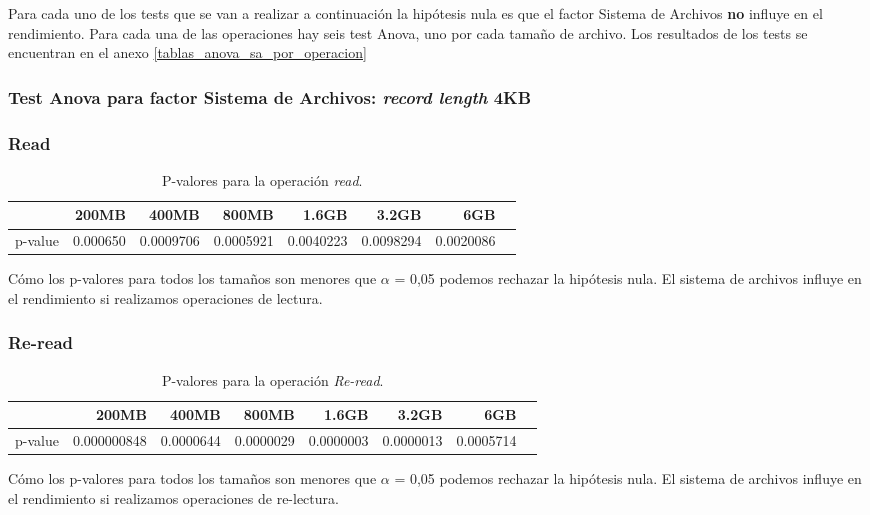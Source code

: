 Para cada uno de los tests que se van a realizar a continuación la hipótesis nula es que el factor Sistema de Archivos \textbf{no} influye en el rendimiento. Para cada una de las operaciones hay seis test Anova, uno por cada tamaño de archivo. Los resultados de los tests se encuentran en el anexo \ref{tablas_anova_sa_por_operacion}
\subsubsection{Test Anova para factor Sistema de Archivos: \textit{record length} 4KB}

\subsubsection{Read}
\begin{table}[!htp]\centering
\scriptsize
\begin{tabular}{lrrrrrrr}\toprule
&200MB &400MB &800MB &1.6GB &3.2GB &6GB \\\midrule
p-value &0.000650 &0.0009706 &0.0005921 &0.0040223 &0.0098294 &0.0020086 \\
\bottomrule
\end{tabular}
\caption{P-valores para la operación \textit{read}.}\label{tab: }
\end{table}

Cómo los p-valores para todos los tamaños son menores que $\alpha$ = 0,05 podemos rechazar la hipótesis nula. El sistema de archivos influye en el rendimiento si realizamos operaciones de lectura. 

\subsubsection{Re-read}
\begin{table}[!htp]\centering
\scriptsize
\begin{tabular}{lrrrrrrr}\toprule
&200MB &400MB &800MB &1.6GB &3.2GB &6GB \\\midrule
p-value &0.000000848 &0.0000644 &0.0000029 &0.0000003 &0.0000013 &0.0005714 \\
\bottomrule
\end{tabular}
\caption{P-valores para la operación \textit{Re-read}.}\label{tab: }
\end{table}

Cómo los p-valores para todos los tamaños son menores que $\alpha$ = 0,05 podemos rechazar la hipótesis nula. El sistema de archivos influye en el rendimiento si realizamos operaciones de re-lectura. 


